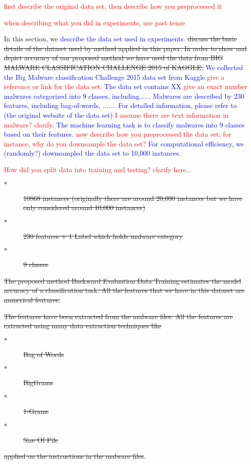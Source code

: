\documentclass[a4paper,conference]{IEEEtran}
\begin{document}
\textcolor{red}{first describe the original data set, then describe 
how you preprocessed it} 

\textcolor{red}{when describing what you did in experiments, 
use past tense} 


In this section, we \textcolor{blue}{describe the data set used 
in experiments}. \sout{discuss the basic details of the dataset used by method applied in this paper. In order to show and depict accuracy of our proposed method we have used the data from BIG MALWARE CLASSIFICATION CHALLENGE 2015 of KAGGLE.} 
\textcolor{blue}{We collected the Big Malware classification Challenge 2015 data set from Kaggle}.\textcolor{red}{give a reference or link for 
the data set}. 
\textcolor{blue}{The data set contains XX} 
\textcolor{red}{give an exact number}
\textcolor{blue}{malwares categorized 
into 9 classes, including...... Malwares are described by 230 features,
including bag-of-words, ....... For detailed information, please refer 
to (the original website of the data set)}
\textcolor{red}{I assume there are text information in 
malware? clarify}. 
\textcolor{blue}{The machine learning task is to classify malwares 
into 9 classes based on their features.} 
\textcolor{red}{now describe how you preprocessed the data set; 
for instance, why do you downsample the data set?} 
\textcolor{blue}{For computational efficiency, we (randomly?) 
downsampled the data set to 10,000 instances.}


\textcolor{red}{How did you split data into training and testing? 
clarify here...} 


\begin{description}
\item[$\ast$] \sout{10868 instances (originally there are around 20,000 instances but we have only considered around 10,000 instances)}
\item[$\ast$] \sout{230 features + 1 Label which holds malware category}
\item[$\ast$] \sout{9 classes}
\end{description}


\sout{The proposed method Backward Evaluation Data Training estimates the model accuracy of a classification task. All the features that we have in this dataset are numerical features.}

\sout{The features have been extracted from the malware files. All the features are extracted using many data extraction techniques like} 
\begin{description}
\item[$\ast$] \sout{Bag of Words}
\item[$\ast$] \sout{BigGrams}
\item[$\ast$] \sout{1-Grams}
\item[$\ast$] \sout{Size Of File}
\end{description}
\sout{applied on the instructions in the malware files}.
\end{document}
